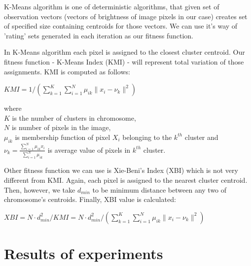 \documentclass[11pt,leqno]{article}
\theoremstyle{mytheoremstyle}
\theoremstyle{mytheoremstyle}
\begin{document}
K-Means algorithm is one of deterministic algorithms, that given set of observation vectors (vectors of brightness of image pixels in our case) creates set of specified size containing centroids for those vectors. We can use it's way of 'rating' sets generated in each iteration as our fitness function.

In K-Means algorithm each pixel is assigned to the closest cluster centroid. Our fitness function - K-Means Index (KMI) - will represent total variation of those assignments. KMI is computed as follows:

\begin{center}
$KMI = 1/\left( \sum\limits_{k=1}^K \sum\limits_{i=1}^N \mu_{ik} \parallel x_i - \nu_k \parallel^2 \right)$
\end{center}

\noindent where \\ $K$ is the number of clusters in chromosome, \\ $N$ is number of pixels in the image, \\ $\mu_{ik}$ is membership function of pixel $X_i$ belonging to the $k^{th}$ cluster and \\ $\nu_k = \frac{\sum\limits_{i=1}^N \mu_{ik} x_i}{\sum\limits_{i=1}^N \mu_{ik}}$ is average value of pixels in $k^{th}$ cluster.

\vspace{0.5cm}

Other fitness function we can use is Xie-Beni's Index (XBI) which is not very different from KMI. Again, each pixel is assigned to the nearest cluster centroid. Then, however, we take $d_{min}$ to be minimum distance between any two of chromosome's centroids. Finally, XBI value is calculated:

\begin{center}
$XBI = N \cdot d_{min}^2 / KMI = N \cdot d_{min}^2 / \left( \sum\limits_{k=1}^K \sum\limits_{i=1}^N \mu_{ik} \parallel x_i - \nu_k \parallel^2 \right)$
\end{center}

\section{Results of experiments}
\end{document}
